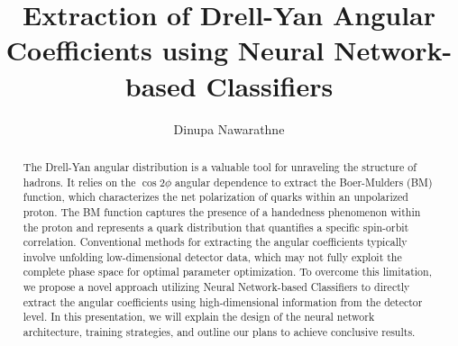 \documentclass{article}
\title{Extraction of Drell-Yan Angular Coefficients using Neural Network-based Classifiers}
\author{Dinupa Nawarathne}
\begin{document}
\maketitle

\begin{abstract}

The Drell-Yan angular distribution is a valuable tool for unraveling the structure of hadrons.
It relies on the $\cos2\phi$ angular dependence to extract the Boer-Mulders (BM) function,
which characterizes the net polarization of quarks within an unpolarized proton.
The BM function captures the presence of a handedness phenomenon within the proton and represents a quark distribution
that quantifies a specific spin-orbit correlation. Conventional methods for extracting the angular coefficients typically
involve unfolding low-dimensional detector data, which may not fully exploit the complete phase space for optimal
parameter optimization. To overcome this limitation, we propose a novel approach utilizing Neural Network-based Classifiers to
directly extract the angular coefficients using high-dimensional information from the detector level. In this presentation,
we will explain the design of the neural network architecture, training strategies, and outline our plans to achieve conclusive results.

\end{abstract}
\end{document}
